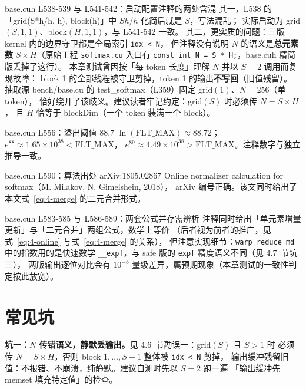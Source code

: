 \begin{kaogu}[F3]{base.cuh L538-539 与 L541-542：启动配置注释的两处含混}
  其一，L538 的「grid(S*h/h, h), block(h)」中 $S h / h$ 化简后就是 $S$，写法混乱；
  实际启动为 grid$(S,1,1)$、block$(H,1,1)$，与 L541-542 一致。
  其二，更实质的问题：三版 kernel 内的边界守卫都是全局索引 \texttt{idx < N}，
  但注释没有说明 $N$ 的语义是\textbf{总元素数} $S \times H$（原始工程
  \texttt{softmax.cu} 入口有 \texttt{const int N = S * H;}，base.cuh 精简版丢掉了这行）。
  本章测试曾因按「每 token 长度」理解 $N$ 并以 $S=2$ 调用而复现故障：
  block 1 的全部线程被守卫剪掉，token 1 的输出\textbf{不写回}（旧值残留）。
  抽取源 bench/base.cu 的 test\_softmax（L359）固定 grid$(1)$、$N = 256$（单 token），
  恰好绕开了该歧义。建议读者牢记约定：grid$(S)$ 时必须传 $N = S \times H$，
  且 $H$ 恰等于 blockDim（一个 token 装满一个 block）。
\end{kaogu}

\begin{kaogu}[F3 核校通过]{base.cuh L556：溢出阈值 88.7}
  $\ln(\mathrm{FLT\_MAX}) \approx 88.72$；$e^{88} \approx 1.65\times 10^{38} < \mathrm{FLT\_MAX}$，
  $e^{89} \approx 4.49\times 10^{38} > \mathrm{FLT\_MAX}$。注释数字与独立推导一致。
\end{kaogu}

\begin{kaogu}[F5 核校通过]{base.cuh L590：算法出处 arXiv:1805.02867}
  Online normalizer calculation for softmax（M. Milakov, N. Gimelshein, 2018），
  arXiv 编号正确。该文同时给出了本文式~\ref{eq:4-merge} 的二元合并形式。
\end{kaogu}

\begin{kaogu}[F3]{base.cuh L583-585 与 L586-589：两套公式并存需辨析}
  注释同时给出「单元素增量更新」与「二元合并」两组公式，数学上等价
  （后者视为前者的推广，见式~\ref{eq:4-online} 与式~\ref{eq:4-merge} 的关系），
  但注意实现细节：\texttt{warp\_\allowbreak{}reduce\_\allowbreak{}md} 中的指数用的是快速数学
  \texttt{\_\_expf}，与 safe 版的 \texttt{expf} 精度语义不同（见 4.7~节坑三），
  两版输出逐位对比会有 $10^{-8}$ 量级差异，属预期现象（本章测试的一致性判定按此放宽）。
\end{kaogu}

\section{常见坑}

\textbf{坑一：$N$ 传错语义，静默丢输出。}见 4.6~节勘误一：grid$(S)$ 且 $S>1$ 时
必须传 $N = S \times H$，否则 block $1, \dots, S-1$ 整体被 \texttt{idx < N} 剪掉，
输出缓冲残留旧值：不报错、不崩溃，纯静默。建议自测时先以 $S=2$ 跑一遍
「输出缓冲先 memset 填充特定值」的检查。

